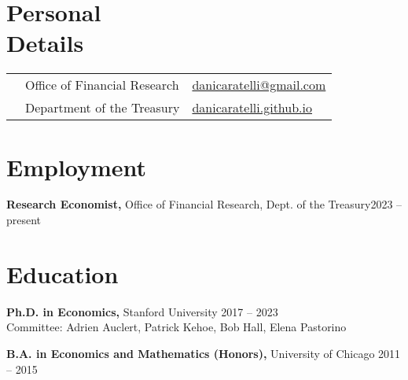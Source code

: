 \documentclass[margin,line]{res}                          %
\newenvironment{list1}{
	\begin{list}{\ding{113}}{%
			\setlength{\itemsep}{0in}
			\setlength{\parsep}{0in} \setlength{\parskip}{0in}
			\setlength{\topsep}{0in} \setlength{\partopsep}{0in}
			\setlength{\leftmargin}{0.17in}}}{\end{list}}
\begin{document}
	
	\begin{resume}
		\thispagestyle{plain} %
		
		\section{\sc Personal \\Details}
		\vspace{.05in}
		\begin{tabular}{@{}p{0.20in}p{2.75in}p{2.75in}}
			& Office of Financial Research      &\href{mailto:danicaratelli@gmail.com}{danicaratelli@gmail.com}
			\\    
			& Department of the Treasury  & \href{https://danicaratelli.github.io/}{danicaratelli.github.io}
		\end{tabular}

		\section{\sc Employment}
		\begin{list1}
			\item[] \textbf{Research Economist,} Office of Financial Research, Dept. of the Treasury\hfill 2023 -- present
		\end{list1}	
		
		\section{\sc Education}
		\begin{list1}
			\item[] \textbf{Ph.D. in Economics,} Stanford University \hfill 2017 -- 2023\\
			Committee: Adrien Auclert, Patrick Kehoe, Bob Hall, Elena Pastorino\smallskip
			\item[] \textbf{B.A. in Economics and Mathematics (Honors),} University of Chicago \hfill 2011 -- 2015
		\end{list1}
		

\end{resume}
\end{document}
